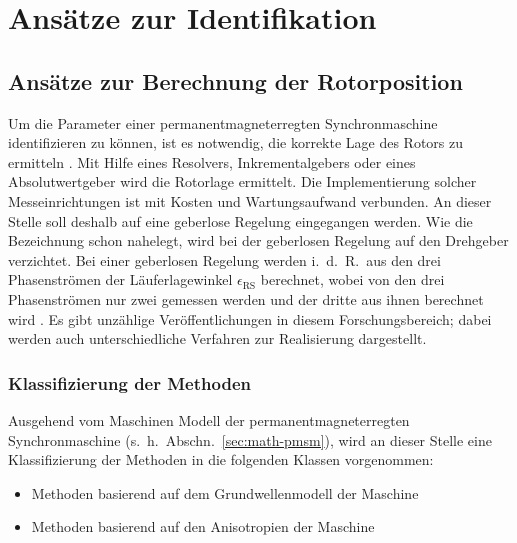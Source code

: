 \documentclass[conference,twocolumn]{IEEEtran}
\newcommand{\x}[1]{\mathrm{#1}}
\begin{document}
\section{Ansätze zur Identifikation}\label{sec:identifikation}
\subsection{Ansätze zur Berechnung der Rotorposition}\label{sec:rotorposition}

Um die Parameter einer permanentmagneterregten Synchronmaschine identifizieren zu können, ist es notwendig, die korrekte Lage des Rotors zu ermitteln \autocites{underwood_online_2010}{rahman_identification_2005}{piippo_adaptation_2009}.
Mit Hilfe eines Resolvers, Inkrementalgebers oder eines Absolutwertgeber wird die Rotorlage ermittelt.
Die Implementierung solcher Messeinrichtungen ist mit Kosten und Wartungsaufwand verbunden.
An dieser Stelle soll deshalb auf eine geberlose Regelung eingegangen werden.
Wie die Bezeichnung schon nahelegt, wird bei der geberlosen Regelung auf den Drehgeber verzichtet.
Bei einer geberlosen Regelung werden i.\ d.\ R.\ aus den drei Phasenströmen der Läuferlagewinkel $\epsilon_\x{RS}$ berechnet, wobei von den drei Phasenströmen nur zwei gemessen werden und der dritte aus ihnen berechnet wird \autocite{ternesfeldkamp}.
Es gibt unzählige Veröffentlichungen in diesem Forschungsbereich; dabei werden auch unterschiedliche Verfahren zur Realisierung dargestellt.

\subsubsection{Klassifizierung der Methoden}
Ausgehend vom Maschinen Modell der permanentmagneterregten Synchronmaschine (s.~h.~Abschn.~\ref{sec:math-pmsm}), wird an dieser Stelle eine Klassifizierung der Methoden in die folgenden Klassen vorgenommen:

\begin{itemize}
	\item Methoden basierend auf dem Grundwellenmodell der Maschine
	\item Methoden basierend auf den Anisotropien der Maschine
\end{itemize}
\end{document}
